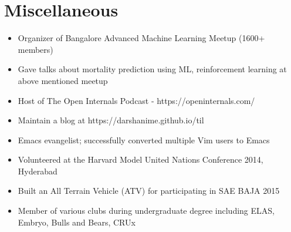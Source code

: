 \documentclass[10pt,letterpaper]{article}
\begin{document}
\section*{Miscellaneous}

\begin{itemize}
    \item Organizer of Bangalore Advanced Machine Learning Meetup (1600+ members)
    \item Gave talks about mortality prediction using ML, reinforcement learning at above mentioned meetup
    \item Host of The Open Internals Podcast - https://openinternals.com/
    \item Maintain a blog at https://darshanime.github.io/til
    \item Emacs evangelist; successfully converted multiple Vim users to Emacs 
    \item Volunteered at the Harvard Model United Nations Conference 2014, Hyderabad
    \item Built an All Terrain Vehicle (ATV) for participating in SAE BAJA 2015
    \item Member of various clubs during undergraduate degree including ELAS, Embryo, Bulls and Bears, CRUx
\end{itemize}
\end{document}

